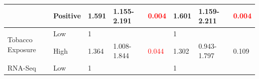 \documentclass[cancers,article,submit,moreauthors,pdftex]{Definitions/mdpi}
\begin{document}
\begin{table}[hp]
{\begin{tabular}{|l|l|l|l|l|l|l|l|}
\cline{2-8}
                                        & Positive                                                                            & 1.591                                                                          & 1.155-2.191                                                                   & \textcolor{red}{0.004}                                                        & 1.601                                                                          & 1.159-2.211                                                                   & \textcolor{red}{0.004}                                                         \\ 
\hline
\multirow{2}{*}{Tobacco Exposure}       & {\cellcolor[rgb]{0.62,0.812,0.878}}Low                                              & {\cellcolor[rgb]{0.62,0.812,0.878}}1                                           & {\cellcolor[rgb]{0.62,0.812,0.878}}                                           & {\cellcolor[rgb]{0.62,0.812,0.878}}                                           & {\cellcolor[rgb]{0.62,0.812,0.878}}1                                           & {\cellcolor[rgb]{0.62,0.812,0.878}}                                           & {\cellcolor[rgb]{0.62,0.812,0.878}}                                            \\ 
\cline{2-8}
                                        & High                                                                                & 1.364                                                                          & 1.008-1.844                                                                   & \textcolor{red}{0.044}                                                        & 1.302                                                                          & 0.943-1.797                                                                   & 0.109                                                                          \\ 
\hline
\multirow{2}{*}{RNA-Seq}                & {\cellcolor[rgb]{0.62,0.812,0.878}}Low                                              & {\cellcolor[rgb]{0.62,0.812,0.878}}1                                           & {\cellcolor[rgb]{0.62,0.812,0.878}}                                           & {\cellcolor[rgb]{0.62,0.812,0.878}}                                           & {\cellcolor[rgb]{0.62,0.812,0.878}}1                                           & {\cellcolor[rgb]{0.62,0.812,0.878}}                                           & {\cellcolor[rgb]{0.62,0.812,0.878}}                                            \\ 

\end{tabular}}
\end{table}
\end{document}
